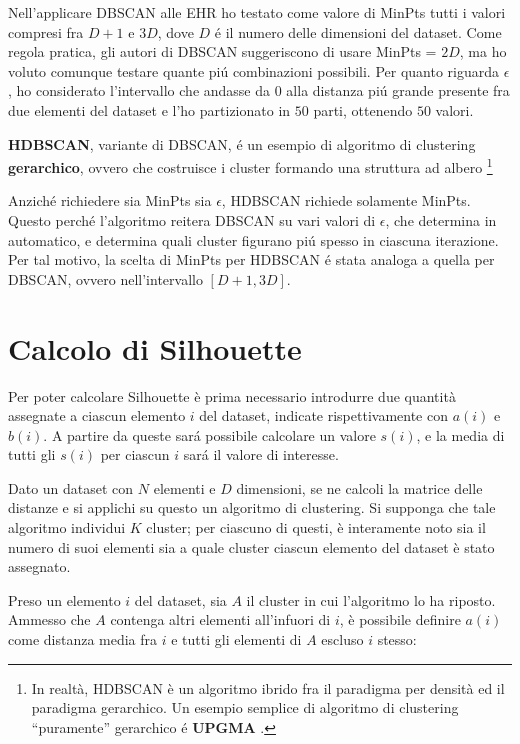\documentclass[a4paper, 12pt]{report}
\begin{document}
				Nell'applicare DBSCAN alle EHR ho testato come valore di MinPts
				tutti i valori compresi fra $D + 1$ e $3D$, dove $D$ é il numero
				delle dimensioni del dataset. Come regola pratica, gli autori
				di DBSCAN suggeriscono di usare MinPts = $2D$, ma ho voluto
				comunque testare quante piú combinazioni possibili. Per quanto
				riguarda $\epsilon$, ho considerato l'intervallo che andasse da
				$0$ alla distanza piú grande presente fra due elementi del
				dataset e l'ho partizionato in $50$ parti, ottenendo $50$ 
				valori.

				\textbf{HDBSCAN}, variante di DBSCAN, é un esempio di
				algoritmo di clustering \textbf{gerarchico}, ovvero che
				costruisce i cluster formando una struttura ad albero
				\footnote{In realtà, HDBSCAN è un algoritmo ibrido fra
				il paradigma per densità ed il paradigma gerarchico. Un
				esempio semplice di algoritmo di clustering ``puramente''
				gerarchico é \textbf{UPGMA} \cite{Sokal1958ASM}.}

				Anziché richiedere sia MinPts sia $\epsilon$, HDBSCAN
				richiede solamente MinPts. Questo perché l'algoritmo
				reitera DBSCAN su vari valori di $\epsilon$, che determina
				in automatico, e determina quali cluster figurano piú spesso
				in ciascuna iterazione. Per tal motivo, la scelta di MinPts
				per HDBSCAN é stata analoga a quella per DBSCAN, ovvero
				nell'intervallo $[D + 1, 3D]$.

		\section{Calcolo di Silhouette}

			Per poter calcolare Silhouette è prima necessario introdurre due
			quantità assegnate a ciascun elemento $i$ del dataset, indicate
			rispettivamente con $a(i)$ e $b(i)$. A partire da queste sará
			possibile calcolare un valore $s(i)$, e la media di tutti gli
			$s(i)$ per ciascun $i$ sará il valore di interesse.

			Dato un dataset con $N$ elementi e $D$ dimensioni, se ne calcoli
			la matrice delle distanze e si applichi su questo un algoritmo
			di clustering. Si supponga che tale algoritmo individui $K$
			cluster; per ciascuno di questi, è interamente noto sia il
			numero di suoi elementi sia a quale cluster ciascun elemento
			del dataset è stato assegnato.

			Preso un elemento $i$ del dataset, sia $A$ il cluster in cui l'algoritmo
			lo ha riposto. Ammesso che $A$ contenga altri elementi all'infuori di $i$,
			è possibile definire $a(i)$ come distanza media fra $i$ e tutti gli elementi
			di $A$ escluso $i$ stesso:
\end{document}
